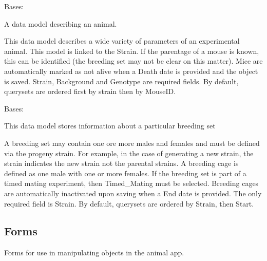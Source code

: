 \documentclass[letterpaper,10pt,english]{sphinxmanual}
\begin{document}

\begin{fulllineitems}
Bases: 

A data model describing an animal.

This data model describes a wide variety of parameters of an experimental animal.  This model is linked to the Strain.  If the parentage of a mouse is known, this can be identified (the breeding set may not be clear on this matter). Mice are automatically marked as not alive when a Death date is provided and the object is saved.  Strain, Background and Genotype are required fields.  By default, querysets are ordered first by strain then by MouseID.

\end{fulllineitems}


\begin{fulllineitems}
Bases: 

This data model stores information about a particular breeding set

A breeding set may contain one ore more males and females and must be defined via the progeny strain.  For example, in the case of generating a new strain, the strain indicates the new strain not the parental strains.  A breeding cage is defined as one male with one or more females.  If the breeding set is part of a timed mating experiment, then Timed\_Mating must be selected.  Breeding cages are automatically inactivated upon saving when a End date is provided.  The only required field is Strain.  By default, querysets are ordered by Strain, then Start.

\end{fulllineitems}



\subsection{Forms}
\label{api:id4}\label{api:module-mousedb.animal.forms}
Forms for use in manipulating objects in the animal app.
\end{document}
